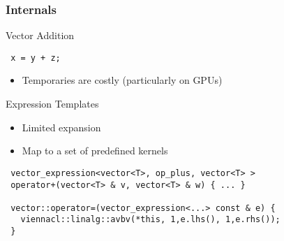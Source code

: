 

\begin{frame}[fragile]
\frametitle{Internals}

 \begin{block}{Vector Addition}
  \begin{lstlisting}
 x = y + z;
  \end{lstlisting}
  
  \begin{itemize}
   \item Temporaries are costly (particularly on GPUs)
  \end{itemize}

 \end{block}


 \begin{block}{Expression Templates}
  \begin{itemize}
   \item Limited expansion
   \item Map to a set of predefined kernels
  \end{itemize}
  
  \begin{lstlisting}
 vector_expression<vector<T>, op_plus, vector<T> >
 operator+(vector<T> & v, vector<T> & w) { ... }

 vector::operator=(vector_expression<...> const & e) {
   viennacl::linalg::avbv(*this, 1,e.lhs(), 1,e.rhs());
 }
  \end{lstlisting}
  \vspace*{0.5cm}

 \end{block}

\end{frame}



